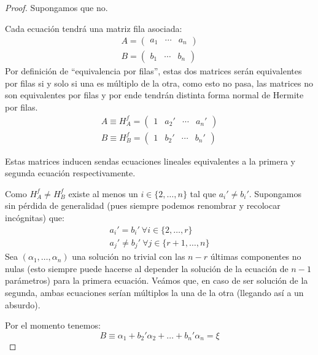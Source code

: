 \begin{proof}
	Supongamos que no.
	
	Cada ecuación tendrá una matriz fila asociada:
	\begin{gather*}
		A=\begin{pmatrix}
			a_1 & \cdots & a_n
		\end{pmatrix}\\
		B=\begin{pmatrix}
			b_1 & \cdots & b_n
		\end{pmatrix}
	\end{gather*}
	Por definición de ``equivalencia por filas'', estas dos matrices serán equivalentes por filas si y solo si una es múltiplo de la otra, como esto no pasa, las matrices no son equivalentes por filas y por ende tendrán distinta forma normal de Hermite por filas.
	\begin{gather*}
		A\equiv H_A^f=\begin{pmatrix}
			1 & a_2' & \cdots & a_n'
		\end{pmatrix}\\
		B\equiv H_B^f=\begin{pmatrix}
			1 & b_2' & \cdots & b_n'
		\end{pmatrix}
	\end{gather*}
	
	Estas matrices inducen sendas ecuaciones lineales equivalentes a la primera y segunda ecuación respectivamente.
	
	Como $H_A^f\not=H_B^f$ existe al menos un $i\in\{2,\dots,n\}$ tal que $a_i'\not=b_i'$. Supongamos sin pérdida de generalidad (pues siempre podemos renombrar y recolocar incógnitas) que:
	\begin{gather*}
		a_i'=b_i'\ \forall i\in\{2,\dots,r\}\\
		a_j'\not=b_j'\ \forall j\in\{r+1,\dots,n\}
	\end{gather*}
	Sea $(\alpha_1,\dots,\alpha_n)$ una solución no trivial con las $n-r$ últimas componentes no nulas (esto siempre puede hacerse al depender la solución de la ecuación de $n-1$ parámetros) para la primera ecuación. Veámos que, en caso de ser solución de la segunda, ambas ecuaciones serían múltiplos la una de la otra (llegando así a un absurdo).
	
	Por el momento tenemos:
	\[B\equiv\alpha_1+b_2'\alpha_2+\dots+b_n'\alpha_n=\xi\]
	

\end{proof}
